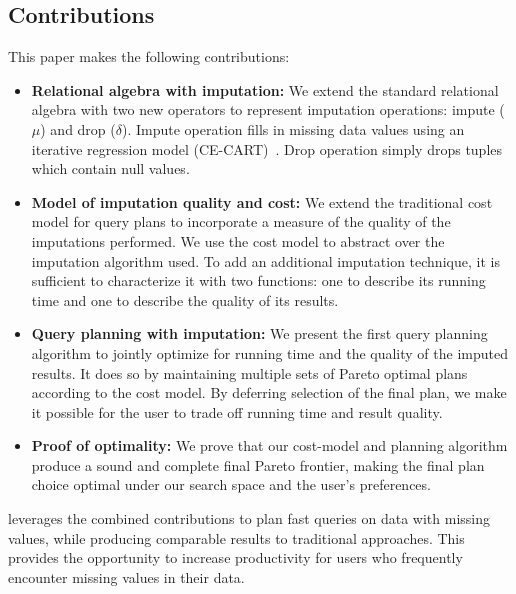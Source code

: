 \subsection{Contributions}
This paper makes the following contributions:
\begin{itemize}
\item \textbf{Relational algebra with imputation:}
  We extend the standard relational algebra with two new operators to represent imputation operations: impute ($\mu$) and drop ($\delta$).
  Impute operation fills in missing data values using an iterative regression model (CE-CART)~\cite{burgette2010multiple}.
  Drop operation simply drops tuples which contain null values.
\item \textbf{Model of imputation quality and cost:}
  We extend the traditional cost model for query plans to incorporate a measure of the quality of the imputations performed.
  We use the cost model to abstract over the imputation algorithm used.
  To add an additional imputation technique, it is sufficient to characterize it with two functions: one to describe its running time and one to describe the quality of its results.
\item \textbf{Query planning with imputation:}
  We present the first query planning algorithm to jointly optimize for running time and the quality of the imputed results.
  It does so by maintaining multiple sets of Pareto optimal plans according to the cost model.
  By deferring selection of the final plan, we make it possible for the user to trade off running time and result quality.
\item \textbf{Proof of optimality:}
 We prove that our cost-model and planning algorithm produce a sound and complete final Pareto frontier, making the final plan choice optimal under our search space and the user's preferences.
\end{itemize}

\ProjectName{} leverages the combined contributions to plan fast queries on data with missing values, while producing comparable results to traditional approaches.
This provides the opportunity to increase productivity for users who frequently encounter missing values in their data.



